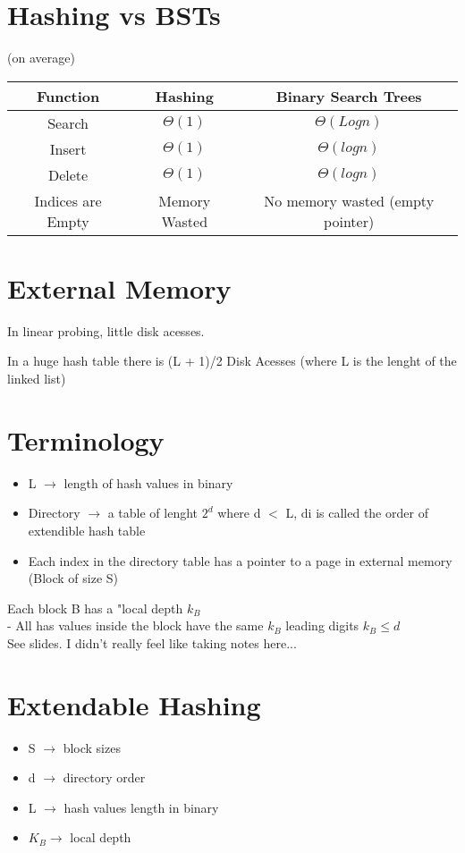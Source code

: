 \documentclass[12pt]{article}
\begin{document}
	\section*{Hashing vs BSTs}
	(on average)\\
	\begin{tabular}{ c | c | c}
		Function & Hashing & Binary Search Trees \\ \hline
		Search & $\Theta(1)$ & $\Theta(Logn)$\\
		Insert & $\Theta(1)$ & $\Theta(logn)$ \\
		Delete & $\Theta(1)$ & $\Theta(logn)$\\
		Indices are Empty & Memory Wasted & No memory wasted (empty pointer) \\
	\end{tabular}
	
	\section*{External Memory}
	In linear probing, little disk acesses.
	
	In a huge hash table there is (L + 1)/2 Disk Acesses (where L is the lenght of the linked list)
	
	\section*{Terminology}
	\begin{itemize}
		\item L $\rightarrow$ length of hash values in binary
		\item Directory $\rightarrow$ a table of lenght $2^d$ where d $<$ L, di is called the order of extendible hash table
		\item Each index in the directory table has a pointer to a page in external memory (Block of size S)
	\end{itemize}
	
	Each block B has a "local depth $k_B$\\
	- All has values inside the block have the same $k_B$ leading digits $k_B \leq d$\\
	
	See slides. I didn't really feel like taking notes here...\\
	
	\section*{Extendable Hashing}
	\begin{itemize}
		\item S $\rightarrow$ block sizes
		\item d $\rightarrow$ directory order
		\item L $\rightarrow$ hash values length in binary
		\item $K_B \rightarrow$ local depth
	\end{itemize}
	
\end{document}
